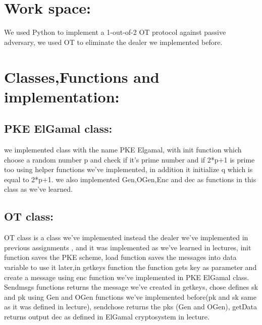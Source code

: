 \documentclass{article}
\begin{document}
\section*{Work space:}
We used Python to implement a 1-out-of-2 OT protocol against passive adversary, we used OT to eliminate  the dealer we implemented before.
\section*{Classes,Functions and implementation:}
\subsection*{PKE ElGamal class:}
we implemented class with the name PKE Elgamal, with init function which choose a random number  p and check if it's prime number  and if 2*p+1 is prime too using helper functions we've implemented, in addition it initialize q which is equal to 2*p+1.
we also implemented Gen,OGen,Enc and dec as functions in this class as we've learned. 
\subsection*{OT class:}
OT class is a class we've implemented instead the dealer we've implemented in previous assignments , and it was implemented as we've learned in lectures, init function saves the PKE scheme, load function saves the messages into data variable to use it later,in getkeys function the function gets key as parameter and create a message using enc function we've implemented in PKE ElGamal class.
Sendmsgs functions returns the message we've created in getkeys, chose defines sk and pk using Gen and OGen functions we've implemented before(pk and sk same as it was defined in lecture), sendchose returns the pks (Gen and OGen), getData returns output dec as defined in ElGamal cryptosystem in lecture.
\end{document}
